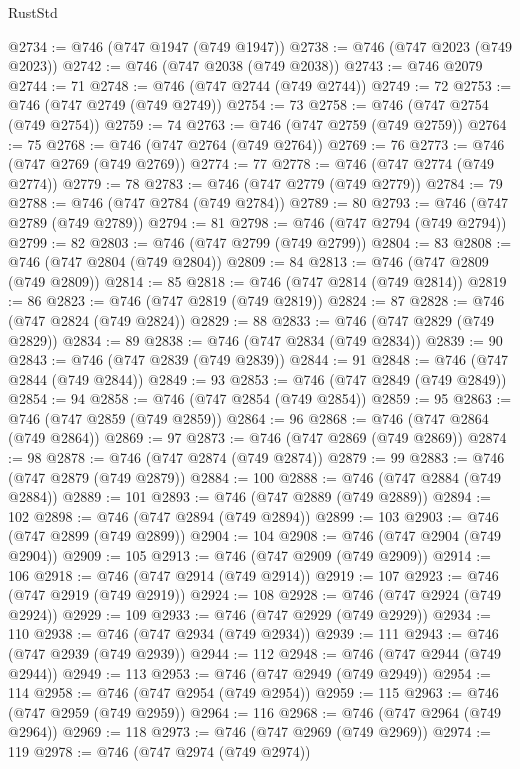 \begin{lexlean}{RustStd}
\begin{coremodule}
{\begin{coremodule}
{{{{{{{{{{{{{{{{{{{{{{{{{{{{{{{{{{{{{{{{{{{{{{{{{{{{{{{{{{{{{{{{{{{{{{{{{{{{{{{{@2734 := @746 (@747 @1947 (@749 @1947))
@2738 := @746 (@747 @2023 (@749 @2023))
@2742 := @746 (@747 @2038 (@749 @2038))
@2743 := @746 @2079
@2744 := 71
@2748 := @746 (@747 @2744 (@749 @2744))
@2749 := 72
@2753 := @746 (@747 @2749 (@749 @2749))
@2754 := 73
@2758 := @746 (@747 @2754 (@749 @2754))
@2759 := 74
@2763 := @746 (@747 @2759 (@749 @2759))
@2764 := 75
@2768 := @746 (@747 @2764 (@749 @2764))
@2769 := 76
@2773 := @746 (@747 @2769 (@749 @2769))
@2774 := 77
@2778 := @746 (@747 @2774 (@749 @2774))
@2779 := 78
@2783 := @746 (@747 @2779 (@749 @2779))
@2784 := 79
@2788 := @746 (@747 @2784 (@749 @2784))
@2789 := 80
@2793 := @746 (@747 @2789 (@749 @2789))
@2794 := 81
@2798 := @746 (@747 @2794 (@749 @2794))
@2799 := 82
@2803 := @746 (@747 @2799 (@749 @2799))
@2804 := 83
@2808 := @746 (@747 @2804 (@749 @2804))
@2809 := 84
@2813 := @746 (@747 @2809 (@749 @2809))
@2814 := 85
@2818 := @746 (@747 @2814 (@749 @2814))
@2819 := 86
@2823 := @746 (@747 @2819 (@749 @2819))
@2824 := 87
@2828 := @746 (@747 @2824 (@749 @2824))
@2829 := 88
@2833 := @746 (@747 @2829 (@749 @2829))
@2834 := 89
@2838 := @746 (@747 @2834 (@749 @2834))
@2839 := 90
@2843 := @746 (@747 @2839 (@749 @2839))
@2844 := 91
@2848 := @746 (@747 @2844 (@749 @2844))
@2849 := 93
@2853 := @746 (@747 @2849 (@749 @2849))
@2854 := 94
@2858 := @746 (@747 @2854 (@749 @2854))
@2859 := 95
@2863 := @746 (@747 @2859 (@749 @2859))
@2864 := 96
@2868 := @746 (@747 @2864 (@749 @2864))
@2869 := 97
@2873 := @746 (@747 @2869 (@749 @2869))
@2874 := 98
@2878 := @746 (@747 @2874 (@749 @2874))
@2879 := 99
@2883 := @746 (@747 @2879 (@749 @2879))
@2884 := 100
@2888 := @746 (@747 @2884 (@749 @2884))
@2889 := 101
@2893 := @746 (@747 @2889 (@749 @2889))
@2894 := 102
@2898 := @746 (@747 @2894 (@749 @2894))
@2899 := 103
@2903 := @746 (@747 @2899 (@749 @2899))
@2904 := 104
@2908 := @746 (@747 @2904 (@749 @2904))
@2909 := 105
@2913 := @746 (@747 @2909 (@749 @2909))
@2914 := 106
@2918 := @746 (@747 @2914 (@749 @2914))
@2919 := 107
@2923 := @746 (@747 @2919 (@749 @2919))
@2924 := 108
@2928 := @746 (@747 @2924 (@749 @2924))
@2929 := 109
@2933 := @746 (@747 @2929 (@749 @2929))
@2934 := 110
@2938 := @746 (@747 @2934 (@749 @2934))
@2939 := 111
@2943 := @746 (@747 @2939 (@749 @2939))
@2944 := 112
@2948 := @746 (@747 @2944 (@749 @2944))
@2949 := 113
@2953 := @746 (@747 @2949 (@749 @2949))
@2954 := 114
@2958 := @746 (@747 @2954 (@749 @2954))
@2959 := 115
@2963 := @746 (@747 @2959 (@749 @2959))
@2964 := 116
@2968 := @746 (@747 @2964 (@749 @2964))
@2969 := 118
@2973 := @746 (@747 @2969 (@749 @2969))
@2974 := 119
@2978 := @746 (@747 @2974 (@749 @2974))
}}}}}}}}}}}}}}}}}}}}}}}}}}}}}}}}}}}}}}}}}}}}}}}}}}}}}}}}}}}}}}}}}}}}}}}}}}}}}}}}
\end{coremodule}}
\end{coremodule}
\end{lexlean}
